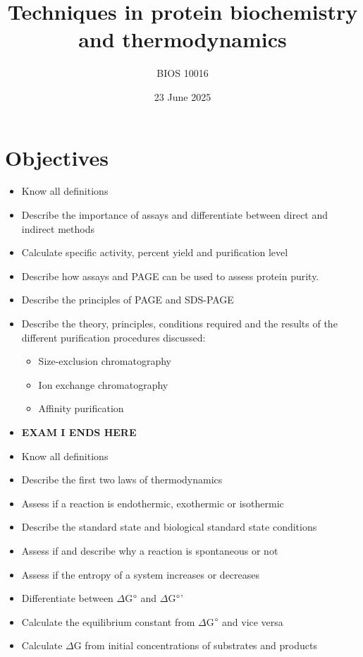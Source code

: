\documentclass[letterpaper, 12pt]{article}
\title{Techniques in protein biochemistry and thermodynamics}
\author{BIOS 10016}
\date{23 June 2025}
\begin{document}
\maketitle

\section*{Objectives}

\begin{itemize}
\item Know all definitions
\item Describe the importance of assays and differentiate between direct and indirect methods
\item Calculate specific activity, percent yield and purification level
\item Describe how assays and PAGE can be used to assess protein purity.
\item Describe the principles of PAGE and SDS-PAGE
\item Describe the theory, principles, conditions required and the results of the different purification procedures discussed:
\begin{itemize}
\item Size-exclusion chromatography
\item Ion exchange chromatography
\item Affinity purification
\end{itemize}
\item \textbf{EXAM I ENDS HERE}
\item Know all definitions
\item Describe the first two laws of thermodynamics
\item Assess if a reaction is endothermic, exothermic or isothermic
\item Describe the standard state and biological standard state conditions
\item Assess if and describe why a reaction is spontaneous or not
\item Assess if the entropy of a system increases or decreases
\item Differentiate between $\Delta$G$\degree$ and $\Delta$G$\degree$’
\item Calculate the equilibrium constant from $\Delta$G$\degree$ and vice versa
\item Calculate $\Delta$G from initial concentrations of substrates and products
\end{itemize}
\end{document}
